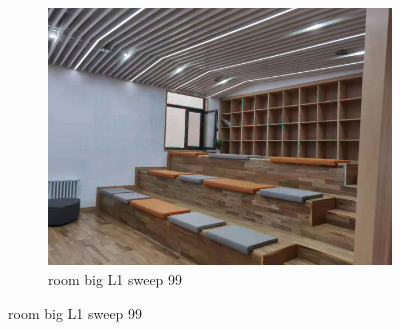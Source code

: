 \documentclass[11pt]{article}
\begin{document}
\begin{figure}[ht!]
\begin{subfigure}[]{0.333\linewidth}
        \centering
        \includegraphics[width=\linewidth]{fig/restoration/room_big/L1/gibbs_99.jpg}
        \caption{room big L1 sweep 99}
    \end{subfigure}%
\end{figure}
\end{document}
